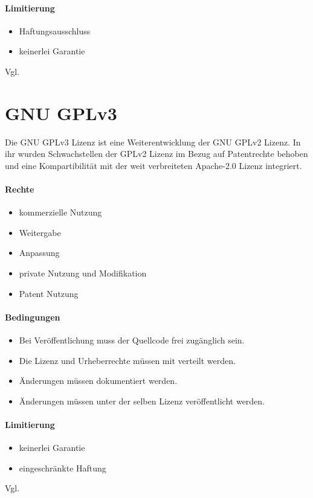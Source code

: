 \paragraph{Limitierung}
\begin{itemize}
    \item Haftungsausschluss
    \item keinerlei Garantie
\end{itemize}
Vgl. \cite{choosealicense-com}

\section{GNU GPLv3}\label{sec:gnu-gplv3}
Die GNU GPLv3 Lizenz ist eine Weiterentwicklung der GNU GPLv2 Lizenz. In ihr wurden Schwachstellen der
GPLv2 Lizenz im Bezug auf Patentrechte behoben und eine Kompartibilität mit der weit verbreiteten
Apache-2.0 Lizenz integriert.

\paragraph{Rechte}
\begin{itemize}
    \item kommerzielle Nutzung
    \item Weitergabe
    \item Anpassung
    \item private Nutzung und Modifikation
    \item Patent Nutzung
\end{itemize}
\paragraph{Bedingungen}
\begin{itemize}
    \item Bei Veröffentlichung muss der Quellcode frei zugänglich sein.
    \item Die Lizenz und Urheberrechte müssen mit verteilt werden.
    \item Änderungen müssen dokumentiert werden.
    \item Änderungen müssen unter der selben Lizenz veröffentlicht werden.
\end{itemize}

\paragraph{Limitierung}
\begin{itemize}
    \item keinerlei Garantie
    \item eingeschränkte Haftung
\end{itemize}
Vgl. \cite{choosealicense-com}

